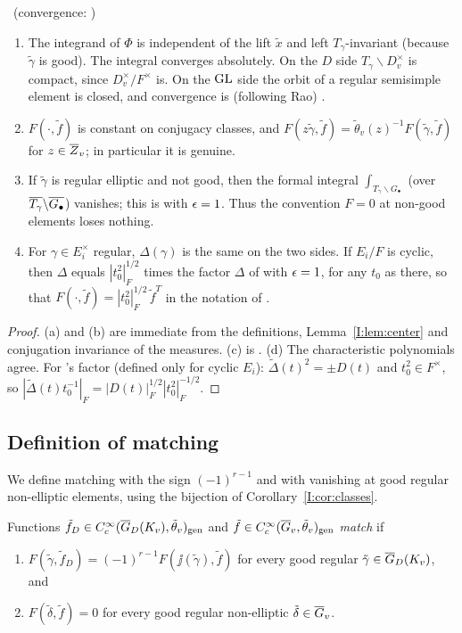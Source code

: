 \begin{lemma}\label{I:lem:oiprops}\ (convergence: \Ev)
\begin{enumerate}[label=(\alph*)]
\item The integrand of $\Phi$ is independent of the lift $\tilde x$ and left $T_\gamma$-invariant (because $\tilde\gamma$ is good). The integral converges absolutely. On the $D$ side $T_\gamma\backslash D_v^\times$ is compact, since $D_v^\times/F^\times$ is. On the $\mathrm{GL}$ side the orbit of a regular semisimple element is closed, and convergence is \cite[\S6]{FK86} (following Rao) \Ev.
\item $F(\cdot,\tilde f)$ is constant on conjugacy classes, and $F(z\tilde\gamma,\tilde f)=\tilde\theta_v(z)^{-1}F(\tilde\gamma,\tilde f)$ for $z\in\overline{Z}_v$; in particular it is genuine.
\item If $\tilde\gamma$ is regular elliptic and not good, then the formal integral $\int_{T_\gamma\backslash G_\bullet}$ (over $\overline{T_\gamma}\backslash\overline{G_\bullet}$) vanishes; this is \cite[Prop.~2.7]{JC26a} with $\epsilon=1$. Thus the convention $F=0$ at non-good elements loses nothing.
\item For $\gamma\in E_i^\times$ regular, $\Delta(\gamma)$ is the same on the two sides. If $E_i/F$ is cyclic, then $\Delta$ equals $|t_0^2|_F^{1/2}$ times the factor $\Delta$ of \cite[\S4.1]{JC26a} with $\epsilon=1$, for any $t_0$ as there, so that $F(\cdot,\tilde f)=|t_0^2|_F^{1/2}\,\tilde f^{T}$ in the notation of \cite[\S4.1]{JC26a}.
\end{enumerate}
\end{lemma}
\begin{proof}
(a) and (b) are immediate from the definitions, Lemma~\ref{I:lem:center} and conjugation invariance of the measures. (c) is \cite[Prop.~2.7]{JC26a}. (d) The characteristic polynomials agree. For \cite{JC26a}'s factor (defined only for cyclic $E_i$): $\tilde\Delta(t)^2=\pm D(t)$ and $t_0^2\in F^\times$, so $|\tilde\Delta(t)t_0^{-1}|_F=|D(t)|_F^{1/2}|t_0^2|_F^{-1/2}$.
\end{proof}

\subsection{Definition of matching}\label{I:subsec:defmatch}
We define matching with the sign $(-1)^{r-1}$ and with vanishing at good regular non-elliptic elements, using the bijection of Corollary~\ref{I:cor:classes}.

\begin{definition}[Matching]\label{I:def:matching}
Functions $\tilde f_D\in C_c^\infty(\overline{G}_D(K_v),\tilde\theta_v)_{\mathrm{gen}}$ and $\tilde f\in C_c^\infty(\overline{G}_v,\tilde\theta_v)_{\mathrm{gen}}$ \emph{match} if
\begin{enumerate}[label=(M\arabic*)]
\item $F(\tilde\gamma,\tilde f_D)=(-1)^{r-1}F(\jj(\tilde\gamma),\tilde f)$ for every good regular $\tilde\gamma\in\overline{G}_D(K_v)$, and
\item $F(\tilde\delta,\tilde f)=0$ for every good regular non-elliptic $\tilde\delta\in\overline{G}_v$.
\end{enumerate}
\end{definition}

